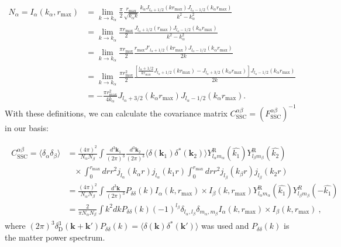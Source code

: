 \documentclass[a4paper,11pt]{article}
\newcommand{\sph}[2]{Y^\text{R}_{l_#1 m_#1}(\hat{#2})}
\newcommand{\jl}[1]{j_{l_#1}}
\newcommand{\dk}{\frac{ d^3 \mathbf{k}}{(2 \pi)^3}}
\newcommand{ \dkv}[1]{\frac{ d^3 \mathbf{k}_{#1}}{(2 \pi)^3}}
\begin{document}
\begin{align}
N_\alpha = I_\alpha(k_\alpha,  r_\text{max}) & = \lim_{k\to k_\alpha} \frac{\pi}{2} \frac{ r_\text{max}}{ \sqrt{ k _ \alpha k}}\frac{k_\alpha J_{l_\alpha+ 1/2}( k  r_\text{max})J_{l_\alpha- 1/2}(k_\alpha  r_\text{max})}{k^2 - k_\alpha^2}\\
&=\lim_{k\to k_\alpha}\frac{\pi r_\text{max}}{2} \frac{J_{l_\alpha+ 1/2}( r_\text{max})J_{l_\alpha- 1/2}(k_\alpha  r_\text{max})}{k^2 - k_\alpha^2}\label{pre_lhopital}\\
&=\lim_{k\to k_\alpha}\frac{\pi r_\text{max}}{2} \frac{r_\text{max}J'_{l_\alpha+ 1/2}(k r_\text{max})J_{l_\alpha- 1/2}(k_\alpha  r_\text{max})}{2 k}\label{post_lhopital}\\
&=\lim_{k\to k_\alpha}\frac{\pi r_\text{max}^2}{2} \frac{\left[\frac{l_\alpha+1/2}{k r_{\text{max}}}J_{l_\alpha+1/2}(k r_\text{max})-J_{l_\alpha+3/2}(k_\alpha{r_\text{max}})\right]J_{l_\alpha- 1/2}(k_\alpha  r_\text{max})}{2 k}\label{post_recurrence}\\
&=-\frac{\pi r_\text{max}^2}{4 k_\alpha}J_{l_\alpha+3/2}(k_\alpha{r_\text{max}})J_{l_\alpha- 1/2}(k_\alpha  r_\text{max})\label{norm_final}.
\end{align}
With these definitions, we can calculate the covariance matrix $C^{\alpha\beta}_\text{SSC}=\left(F^{\alpha\beta}_\text{SSC}\right)^{-1}$ in our basis:

\begin{align} \label{C_SSC}
\begin{split} 
C^{\alpha\beta}_{\text{SSC}}=\langle \delta_\alpha \delta_\beta \rangle &= \frac{ (4 \pi)^2}{N_\alpha N_\beta} \int  \dkv{1} \dkv{2} \langle \delta(\mathbf{k}_1) \delta^*(\mathbf{k}_2) \rangle \sph{\alpha}{k_1} \sph{\beta}{k_2} \\
& \;\;\; \times   \int_0^{r_\text{max}}  dr r^2 \jl{\alpha}(k_\alpha r) \jl{\alpha}( k_1 r) \int_0^{r_\text{max}}  dr r^2 \jl{\beta}(k_\beta r) \jl{\beta}( k_2 r)  \\
&= \frac{ (4 \pi)^2}{N_\alpha N_\beta} \int \dk P_{\delta\delta}(k) I_\alpha(k, r_\text{max}) \times I_\beta(k, r_\text{max})\sph{\alpha}{k_1}Y^R_{l_\beta m_\beta}(-\hat{k_1})\\
&=\frac{2}{\pi N_\alpha N_\beta}\int{k^2 dk P_{\delta\delta}(k)(-1)^{l_\beta} \delta_{l_\alpha,l_\beta}\delta_{m_\alpha,m_\beta} I_\alpha(k, r_\text{max}) \times I_\beta(k, r_\text{max})}~,
\end{split} 
\end{align} 
where $(2 \pi)^3 \delta^3_\text{D}( \mathbf{k} + \mathbf{k}') P_{\delta\delta}(k) =  \langle \delta(\mathbf{k}) \delta^*(\mathbf{k}') \rangle$ was used and $P_{\delta\delta}(k)$ is the matter power spectrum.
\end{document}
